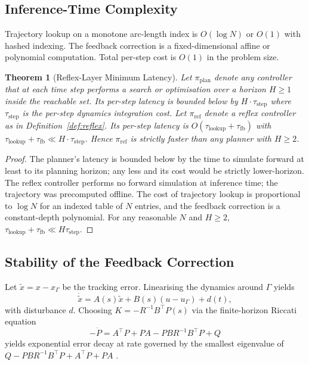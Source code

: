 \documentclass[11pt,twocolumn]{article}
\newtheorem{theorem}{Theorem}
\theoremstyle{definition}
\theoremstyle{remark}
\begin{document}
\subsection{Inference-Time Complexity}

Trajectory lookup on a monotone arc-length index is $O(\log N)$ or $O(1)$ with hashed indexing. The feedback correction is a fixed-dimensional affine or polynomial computation. Total per-step cost is $O(1)$ in the problem size.

\begin{theorem}[Reflex-Layer Minimum Latency]\label{thm:reflex-min}
Let $\pi_{\mathrm{plan}}$ denote any controller that at each time step performs a search or optimisation over a horizon $H \ge 1$ inside the reachable set. Its per-step latency is bounded below by $H \cdot \tau_{\mathrm{step}}$ where $\tau_{\mathrm{step}}$ is the per-step dynamics integration cost. Let $\pi_{\mathrm{ref}}$ denote a reflex controller as in Definition~\ref{def:reflex}. Its per-step latency is $O(\tau_{\mathrm{lookup}} + \tau_{\mathrm{fb}})$ with $\tau_{\mathrm{lookup}} + \tau_{\mathrm{fb}} \ll H \cdot \tau_{\mathrm{step}}$. Hence $\pi_{\mathrm{ref}}$ is strictly faster than any planner with $H \ge 2$.
\end{theorem}

\begin{proof}
The planner's latency is bounded below by the time to simulate forward at least to its planning horizon; any less and its cost would be strictly lower-horizon. The reflex controller performs no forward simulation at inference time; the trajectory was precomputed offline. The cost of trajectory lookup is proportional to $\log N$ for an indexed table of $N$ entries, and the feedback correction is a constant-depth polynomial. For any reasonable $N$ and $H \ge 2$, $\tau_{\mathrm{lookup}} + \tau_{\mathrm{fb}} \ll H \tau_{\mathrm{step}}$.
\end{proof}

\subsection{Stability of the Feedback Correction}

Let $\tilde x = x - x_{\Gamma}$ be the tracking error. Linearising the dynamics around $\Gamma$ yields
\begin{equation}
\dot{\tilde x} = A(s) \tilde x + B(s)(u - u_{\Gamma}) + d(t),
\end{equation}
with disturbance $d$. Choosing $K = -R^{-1} B^{\top} P(s)$ via the finite-horizon Riccati equation
\begin{equation}
-\dot P = A^{\top} P + P A - P B R^{-1} B^{\top} P + Q
\end{equation}
yields exponential error decay at rate governed by the smallest eigenvalue of $Q - P B R^{-1} B^{\top} P + A^{\top}P + PA$ \cite{bryson1975applied,kirk2012optimal,bertsekas2012dynamic}.
\end{document}
